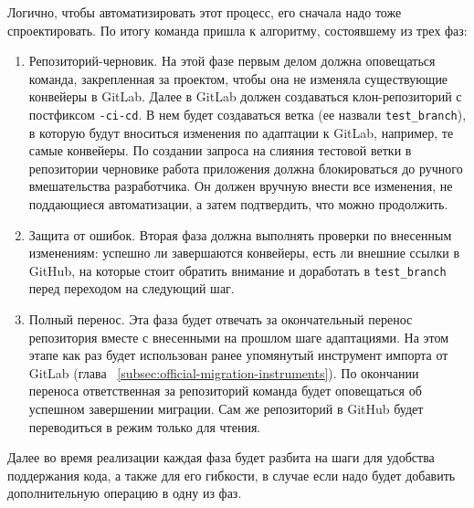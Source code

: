 Логично, чтобы автоматизировать этот процесс, его сначала надо тоже спроектировать.
По итогу команда пришла к алгоритму, состоявшему из трех фаз:
\begin{enumerate}
  \item Репозиторий-черновик.
        На этой фазе первым делом должна оповещаться команда, закрепленная за проектом, чтобы она не изменяла существующие конвейеры в GitLab.
        Далее в GitLab должен создаваться клон-репозиторий с постфиксом \texttt{-ci-cd}.
        В нем будет создаваться ветка (ее назвали \texttt{test\_branch}), в которую будут вноситься изменения по адаптации к GitLab, например, те самые конвейеры.
        По создании запроса на слияния тестовой ветки в репозитории черновике работа приложения должна блокироваться до ручного вмешательства разработчика.
        Он должен вручную внести все изменения, не поддающиеся автоматизации, а затем подтвердить, что можно продолжить.
  \item Защита от ошибок.
        Вторая фаза должна выполнять проверки по внесенным изменениям: успешно ли завершаются конвейеры, есть ли внешние ссылки в GitHub,
        на которые стоит обратить внимание и доработать в \texttt{test\_branch} перед переходом на следующий шаг.
  \item Полный перенос.
        Эта фаза будет отвечать за окончательный перенос репозитория вместе с внесенными на прошлом шаге адаптациями.
        На этом этапе как раз будет использован ранее упомянутый инструмент импорта от GitLab (глава ~\ref{subsec:official-migration-instruments}).
        По окончании переноса ответственная за репозиторий команда будет оповещаться об успешном завершении миграции.
        Сам же репозиторий в GitHub будет переводиться в режим только для чтения.
\end{enumerate}

Далее во время реализации каждая фаза будет разбита на шаги для удобства поддержания кода, а также для его гибкости,
в случае если надо будет добавить дополнительную операцию в одну из фаз.

